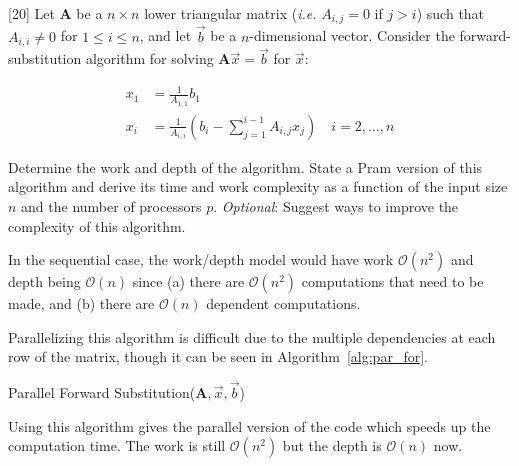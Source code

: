 \documentclass[addpoints]{exam}
\newcommand{\BigO}[1]{\mathcal{O}\left( #1\right)}
\begin{document}
\begin{questions}
\begin{solution}
\end{solution}

\newpage

[20]
Let $\mathbf{A}$ be a $n\times n$ lower triangular matrix ({\em i.e.} $A_{i,j}=0$ if $j>i$) such that $A_{i,i}\neq 0$ for $1\leq i\leq n$, and let $\vec{b}$ be a $n$-dimensional vector. Consider the forward-substitution algorithm for solving $\mathbf{A}\vec{x}=\vec{b}$ for $\vec{x}$:

\begin{align*}
x_{1} &= \frac{1}{A_{1,1}}b_{1}\\
x_{i} &= \frac{1}{A_{i,i}}\left(b_{i}-\sum_{j=1}^{i-1}A_{i,j}x_{j}\right)\quad i=2,\ldots,n
\end{align*}

Determine the work and depth of the algorithm. State a {\sc Pram} version of this algorithm and derive its time and work complexity as a function of the input size $n$ and the number of processors $p$. {\em Optional}: Suggest ways to improve the complexity of this algorithm. 

\begin{solution}
In the sequential case, the work/depth model would have work $\BigO{n^{2}}$ and depth being $\BigO{n}$ since (a) there are $\BigO{n^{2}}$ computations that need to be made, and (b) there are $\BigO{n}$ dependent computations.

Parallelizing this algorithm is difficult due to the multiple dependencies at each row of the matrix, though it can be seen in Algorithm~\ref{alg:par_for}. %

\begin{algorithm}[H]
\caption{Parallel Forward Substitution($\mathbf{A}, \vec{x}, \vec{b}$)}
\begin{algorithmic}[1]
    \ENDFOR
\ENDFOR
\end{algorithmic}
\label{alg:par_for}
\end{algorithm}

Using this algorithm gives the parallel version of the code which speeds up the computation time. The work is still $\BigO{n^{2}}$ but the depth is $\BigO{n}$ now.


\end{solution}
\end{questions}
\end{document}
